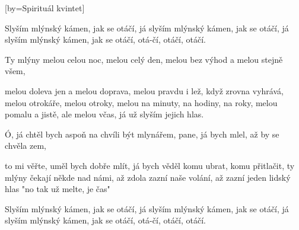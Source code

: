 [by={Spirituál kvintet}]

\beginchorus{}
Slyším mlýnský kámen, jak se otáčí,
já slyším mlýnský kámen, jak se otáčí,
já slyším mlýnský kámen, jak se otáčí,
otá-čí, otáčí, otáčí. 
\endchorus{}

\beginverse{}
Ty mlýny melou celou noc, melou celý den,
melou bez výhod a melou stejně všem,
\endverse{}

\beginverse{}
melou doleva jen a melou doprava,
melou pravdu i lež, když zrovna vyhrává,
melou otrokáře, melou otroky,
melou na minuty, na hodiny, na roky,
melou pomalu a jistě, ale melou včas,
já už slyším jejich hlas.
\endverse{}

\beginchorus{}
\phantom{}
\endchorus{}

\beginverse{}
Ó, já chtěl bych aspoň na chvíli být mlynářem,
pane, já bych mlel, až by se chvěla zem,
\endverse{}

\beginverse{}
to mi věřte, uměl bych dobře mlít,
já bych věděl komu ubrat, komu přitlačit,
ty mlýny čekají někde nad námi,
až zdola zazní naše volání,
až zazní jeden lidský hlas
"no tak už melte, je čas"
\endverse{}

\beginchorus{}
Slyším mlýnský kámen, jak se otáčí,
já slyším mlýnský kámen, jak se otáčí,
já slyším mlýnský kámen, jak se otáčí,
otá-čí, otáčí, otáčí. 
\endchorus{}

\endsong{}
